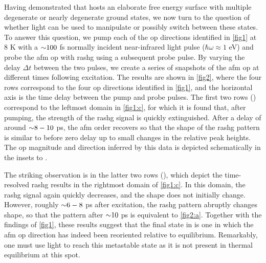 Having demonstrated that \cmb hosts an elaborate free energy surface with multiple degenerate or nearly degenerate ground states, we now turn to the question of whether light can be used to manipulate or possibly switch between these states. 
To answer this question, we pump each of the \gls{op} directions identified in \cref{fig1} at $8$ \si{K} with a ${\sim} 100$ \si{fs} normally incident near-infrared light pulse ($\hbar \omega \approx 1$ \si{eV}) and probe the \gls{afm} \gls{op} with \gls{rashg} using a subsequent probe pulse.
By varying the delay $\Delta t$ between the two pulses, we create a series of snapshots of the \gls{afm} \gls{op} at different times following excitation.
The results are shown in \cref{fig2}, where the four rows correspond to the four \gls{op} directions identified in \cref{fig1}, and the horizontal axis is the time delay between the pump and probe pulses.
The first two rows () correspond to the leftmost domain in \cref{fig1:c}, for which it is found that, after pumping, the strength of the \gls{rashg} signal is quickly extinguished.
After a delay of around ${\sim} 8-10$ \si{ps}, the \gls{afm} order recovers so that the shape of the \gls{rashg} pattern is similar to before zero delay up to small changes in the relative peak heights.
The \gls{op} magnitude and direction inferred by this data is depicted schematically in the insets to .

The striking observation is in the latter two rows (), which depict the time-resolved \gls{rashg} results in the rightmost domain of \cref{fig1:c}.
In this domain, the \gls{rashg} signal again quickly decreases, and the shape does not initially change.
However, roughly ${\sim} 6-8$ \si{ps} after excitation, the \gls{rashg} pattern abruptly changes shape, so that the pattern after ${\sim} 10$ \si{ps} is equivalent to \cref{fig2:a}.
Together with the findings of \cref{fig1}, these results suggest that the final state in  is one in which the \gls{afm} \gls{op} direction has indeed been reoriented relative to equilibrium.
Remarkably, one must use light to reach this metastable state as it is not present in thermal equilibrium at this spot.

